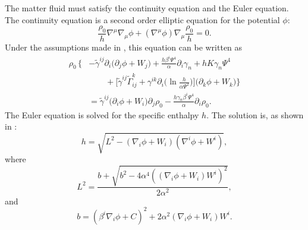 The matter fluid must satisfy the continuity equation and the Euler equation. The continuity equation is a second order elliptic equation for the potential $\phi$:
\begin{equation}
\frac{\rho_0}{h}\nabla^{\mu}\nabla_{\mu}\phi+\left(\nabla^{\mu}\phi\right)\nabla_{\mu}\frac{\rho_0}{h}=0.
\end{equation}
Under the assumptions made in \cite{Tichy:2011gw}, this equation can be written as
\begin{align}
\rho_0\,\bigg\{\!\!&-\tilde{\gamma}^{ij}\partial_i\big(\partial_j\phi+W_j\big)  + \frac{h\beta^i\Psi^4}{\alpha}\partial_i\gamma_n + hK\gamma_n\Psi^4 \nonumber\\
&\qquad+\Big[\tilde{\gamma}^{ij}\tilde{\Gamma}^k_{ij}+\gamma^{ik}\partial_i\big(\ln \frac{h}{\alpha\Psi^2}\big)\Big] 
\big(\partial_k\phi+W_k\big) \bigg\} \nonumber \\
&=\tilde{\gamma}^{ij}\big(\partial_i\phi+W_i\big)\partial_j\rho_0 - \frac{h\gamma_n\beta^i\Psi^4}{\alpha}\partial_i\rho_0.
\label{eq:Continuity}
\end{align}
The Euler equation is solved for the specific enthalpy $h$. The
solution is, as shown in \cite{Tichy:2011gw}:
\begin{equation}
h = \sqrt{L^2 -
  \left(\nabla_i\phi+W_i\right)\left(\nabla^i\phi+W^i\right)},
\end{equation}
where
\begin{equation}
L^2 =
\frac{b+\sqrt{b^2-4\alpha^4\left(\left(\nabla_i\phi+W_i\right)W^i\right)^2}}{2\alpha^2},
\end{equation}
and
\begin{equation}
b =
\left(\beta^i\nabla_i\phi+C\right)^2+2\alpha^2\left(\nabla_i\phi+W_i\right)W^i.
\end{equation}

